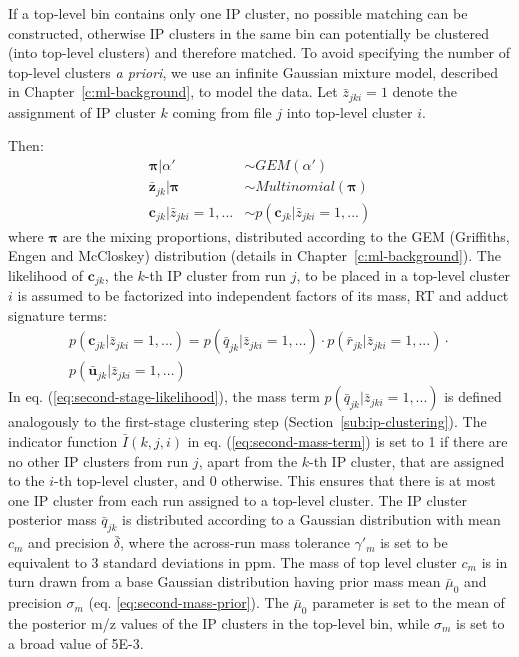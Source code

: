 If a top-level bin contains only one IP cluster, no possible matching can be constructed, otherwise IP clusters in the same bin can potentially be clustered (into top-level clusters) and therefore matched. To avoid specifying the number of top-level clusters \textit{a priori}, we use an infinite Gaussian mixture model, described in Chapter~\ref{c:ml-background}, to model the data. Let $\bar{z}_{jki}=1$ denote the assignment of IP cluster $k$ coming from file $j$ into top-level cluster $i$.

Then:
\begin{align}
\boldsymbol{\pi}\vert\alpha' &\sim GEM(\alpha') \\
\boldsymbol{\bar{z}}_{jk}\vert\boldsymbol{\pi} &\sim Multinomial(\boldsymbol{\pi}) \\
\boldsymbol{c}_{jk}\vert\bar{z}_{jki}=1,... &\sim p(\boldsymbol{c}_{jk}\vert\bar{z}_{jki}=1,...)
\end{align}
where $\boldsymbol{\pi}$ are the mixing proportions, distributed according to the GEM (Griffiths, Engen and McCloskey) distribution (details in Chapter~\ref{c:ml-background}). The likelihood of $\boldsymbol{c}_{jk}$, the $k$-th IP cluster from run $j$, to be placed in a top-level cluster $i$ is assumed to be factorized into independent factors of its mass, RT and adduct signature terms:
\begin{equation}\label{eq:second-stage-likelihood}
\begin{split}
p(\boldsymbol{c}_{jk}\vert\bar{z}_{jki}=1,...) = p({\bar{q}}_{jk}\vert\bar{z}_{jki}=1,...) \cdot p({\bar{r}}_{jk}\vert\bar{z}_{jki}=1,...) \cdot \\
p({\boldsymbol{\bar{u}}}_{jk}\vert\bar{z}_{jki}=1,...)
\end{split}
\end{equation}
In eq. (\ref{eq:second-stage-likelihood}), the mass term $p({\bar{q}}_{jk}\vert\bar{z}_{jki}=1,...)$ is defined analogously to the first-stage clustering step (Section~\ref{sub:ip-clustering}). The indicator function $\bar{I}(k,j,i)$ in eq. (\ref{eq:second-mass-term}) is set to 1 if there are no other IP clusters from run $j$, apart from the $k$-th IP cluster, that are assigned to the $i$-th top-level cluster, and 0 otherwise. This ensures that there is at most one IP cluster from each run assigned to a top-level cluster. The IP cluster posterior mass ${\bar{q}}_{jk}$ is distributed according to a Gaussian distribution with mean $c_m$ and precision $\bar{\delta}$, where the across-run mass tolerance $\gamma'_m$ is set to be equivalent to 3 standard deviations in ppm. The mass of top level cluster $c_m$ is in turn drawn from a base Gaussian distribution having prior mass mean $\bar{\mu}_0$ and precision $\sigma_m$ (eq. \ref{eq:second-mass-prior}). The $\bar{\mu}_0$ parameter is set to the mean of the posterior m/z values of the IP clusters in the top-level bin, while $\sigma_m$ is set to a broad value of 5E-3. 
